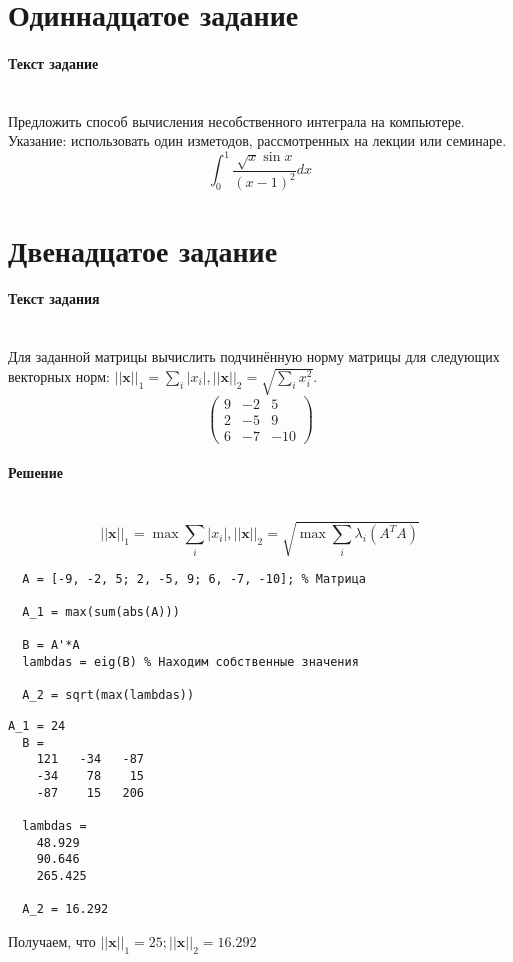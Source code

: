\section{Одиннадцатое задание}
\paragraph{Текст задание} ~\\
Предложить способ вычисления несобственного интеграла на компьютере. Указание: использовать один изметодов, рассмотренных на лекции или семинаре.
\[
  \int_{0}^{1}\frac{\sqrt{x} \sin x}{(x - 1)^{2}} dx
\]

\section{Двенадцатое задание}
\paragraph{Текст задания} ~\\
Для заданной матрицы вычислить подчинённую норму матрицы для следующих векторных норм: $ ||\textbf{x}||_{1} = \sum_{i}|x_{i}|, ||\textbf{x}||_{2} = \sqrt{\sum_{i} x_{i}^{2}}$.\\
\[
  \begin{pmatrix}
    9 & -2 & 5\\
    2 & -5 & 9\\
    6 & -7 & -10
  \end{pmatrix}
\]

\paragraph{Решение} ~\\
\[
  ||\textbf{x}||_{1} = \max \sum_{i} |x_{i}|, ||\textbf{x}||_{2} = \sqrt{\max \sum_{i} \lambda_{i} (A^{T}A)}
\]
\begin{lstlisting}
  A = [-9, -2, 5; 2, -5, 9; 6, -7, -10]; % Матрица

  A_1 = max(sum(abs(A)))

  B = A'*A
  lambdas = eig(B) % Находим собственные значения

  A_2 = sqrt(max(lambdas))
\end{lstlisting}
\begin{lstlisting}[backgroundcolor=\color{cyan}]
  A_1 = 24
  B =
    121   -34   -87
    -34    78    15
    -87    15   206

  lambdas =
    48.929
    90.646
    265.425

  A_2 = 16.292
\end{lstlisting}
Получаем, что $||\textbf{x}||_{1} = 25; ||\textbf{x}||_{2} = 16.292$

